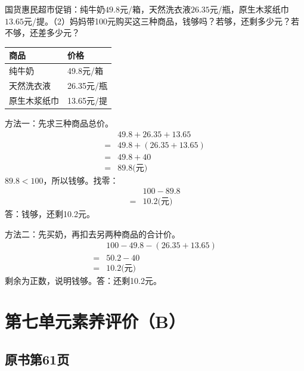 国货惠民超市促销：纯牛奶\(49.8\)元/箱，天然洗衣液\(26.35\)元/瓶，原生木浆纸巾\(13.65\)元/提。（2）妈妈带100元购买这三种商品，钱够吗？若够，还剩多少元？若不够，还差多少元？\par
\par\smallskip{}\begingroup\small\setlength{\tabcolsep}{3pt}
\noindent\begin{tabularx}{\linewidth}{|*{2}{>{\centering\arraybackslash}X|}}\hline
商品 & 价格\\\hline
纯牛奶 & 49.8元/箱\\\hline
天然洗衣液 & 26.35元/瓶\\\hline
原生木浆纸巾 & 13.65元/提\\\hline
\end{tabularx}\par
\endgroup\smallskip
\begin{BookAnswer}
方法一：先求三种商品总价。\[\begin{aligned}&49.8+26.35+13.65\\={}&49.8+(26.35+13.65)\\={}&49.8+40\\={}&89.8\text{(元)}\end{aligned}\]\(89.8<100\)，所以钱够。找零：\[\begin{aligned}&100-89.8\\={}&10.2\text{(元)}\end{aligned}\]答：钱够，还剩10.2元。\par 方法二：先买奶，再扣去另两种商品的合计价。\[\begin{aligned}&100-49.8-(26.35+13.65)\\={}&50.2-40\\={}&10.2\text{(元)}\end{aligned}\]剩余为正数，说明钱够。答：还剩10.2元。
\end{BookAnswer}


\section{第七单元素养评价（B）}



\subsection*{原书第61页}

